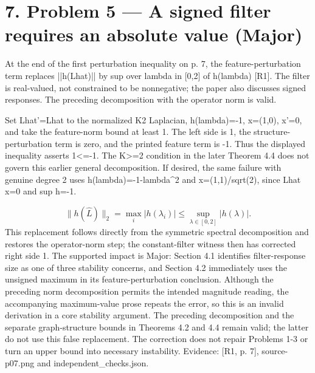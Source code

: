 \documentclass[10pt]{article}
\begin{document}
\section*{7. Problem 5 — A signed filter requires an absolute value (Major)}
At the end of the first perturbation inequality on p. 7, the feature-perturbation term replaces ||h(Lhat)|| by sup over lambda in [0,2] of h(lambda) [R1]. The filter is real-valued, not constrained to be nonnegative; the paper also discusses signed responses. The preceding decomposition with the operator norm is valid.\par
Set Lhat’=Lhat to the normalized K2 Laplacian, h(lambda)=-1, x=(1,0), x’=0, and take the feature-norm bound at least 1. The left side is 1, the structure-perturbation term is zero, and the printed feature term is -1. Thus the displayed inequality asserts 1<=-1. The K>=2 condition in the later Theorem 4.4 does not govern this earlier general decomposition. If desired, the same failure with genuine degree 2 uses h(lambda)=-1-lambda\textasciicircum{}2 and x=(1,1)/sqrt(2), since Lhat x=0 and sup h=-1.\par
\[\|h(\widehat L)\|_2=\max_i|h(\lambda_i)|\le\sup_{\lambda\in[0,2]}|h(\lambda)|.\] This replacement follows directly from the symmetric spectral decomposition and restores the operator-norm step; the constant-filter witness then has corrected right side 1. The supported impact is Major: Section 4.1 identifies filter-response size as one of three stability concerns, and Section 4.2 immediately uses the unsigned maximum in its feature-perturbation conclusion. Although the preceding norm decomposition permits the intended magnitude reading, the accompanying maximum-value prose repeats the error, so this is an invalid derivation in a core stability argument. The preceding decomposition and the separate graph-structure bounds in Theorems 4.2 and 4.4 remain valid; the latter do not use this false replacement. The correction does not repair Problems 1-3 or turn an upper bound into necessary instability. Evidence: [R1, p. 7], source-p07.png and independent\_checks.json.\par
\end{document}
